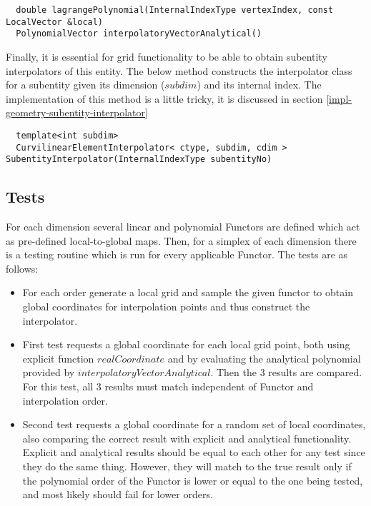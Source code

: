\begin{mybox}
\begin{lstlisting}
  double lagrangePolynomial(InternalIndexType vertexIndex, const LocalVector &local)
  PolynomialVector interpolatoryVectorAnalytical()
\end{lstlisting}
\end{mybox}

\noindent
Finally, it is essential for grid functionality to be able to obtain subentity interpolators of this entity. The below method constructs the interpolator class for a subentity given its dimension ($subdim$) and its internal index. The implementation of this method is a little tricky, it is discussed in section 
\ref{impl-geometry-subentity-interpolator}

\begin{mybox}
\begin{lstlisting}
  template<int subdim>
  CurvilinearElementInterpolator< ctype, subdim, cdim > SubentityInterpolator(InternalIndexType subentityNo)
\end{lstlisting}
\end{mybox}







\subsection{Tests}

\noindent
For each dimension several linear and polynomial Functors are defined which act as pre-defined local-to-global maps. Then, for a simplex of each dimension there is a testing routine which is run for every applicable Functor. The tests are as follows:
\begin{itemize}
	\item For each order generate a local grid and sample the given functor to obtain global coordinates for interpolation points and thus construct the interpolator.
	\item First test requests a global coordinate for each local grid point, both using explicit function $realCoordinate$ and by evaluating the analytical polynomial provided by $interpolatoryVectorAnalytical$. Then the 3 results are compared. For this test, all 3 results must match independent of Functor and interpolation order.
	\item Second test requests a global coordinate for a random set of local coordinates, also comparing the correct result with explicit and analytical functionality. Explicit and analytical results should be equal to each other for any test since they do the same thing. However, they will match to the true result only if the polynomial order of the Functor is lower or equal to the one being tested, and most likely should fail for lower orders.
\end{itemize}

